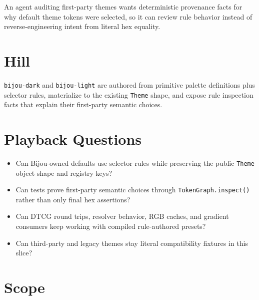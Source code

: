 An agent auditing first-party themes wants deterministic provenance facts for why default theme tokens were selected, so it can review rule behavior instead of reverse-engineering intent from literal hex equality.

\section{Hill}\label{record-185-hill}

\texttt{b\allowbreak{}i\allowbreak{}j\allowbreak{}o\allowbreak{}u\allowbreak{}-\allowbreak{}d\allowbreak{}a\allowbreak{}r\allowbreak{}k} and \texttt{b\allowbreak{}i\allowbreak{}j\allowbreak{}o\allowbreak{}u\allowbreak{}-\allowbreak{}l\allowbreak{}i\allowbreak{}g\allowbreak{}h\allowbreak{}t} are authored from primitive palette definitions plus selector rules, materialize to the existing \texttt{T\allowbreak{}h\allowbreak{}e\allowbreak{}m\allowbreak{}e} shape, and expose rule inspection facts that explain their first-party semantic choices.

\section{Playback Questions}\label{record-185-playback-questions}

\begin{itemize}
\tightlist
\item
  Can Bijou-owned defaults use selector rules while preserving the public \texttt{T\allowbreak{}h\allowbreak{}e\allowbreak{}m\allowbreak{}e} object shape and registry keys?
\item
  Can tests prove first-party semantic choices through \texttt{T\allowbreak{}o\allowbreak{}k\allowbreak{}e\allowbreak{}n\allowbreak{}G\allowbreak{}r\allowbreak{}a\allowbreak{}p\allowbreak{}h\allowbreak{}.\allowbreak{}i\allowbreak{}n\allowbreak{}s\allowbreak{}p\allowbreak{}e\allowbreak{}c\allowbreak{}t\allowbreak{}(\allowbreak{})} rather than only final hex assertions?
\item
  Can DTCG round trips, resolver behavior, RGB caches, and gradient consumers keep working with compiled rule-authored presets?
\item
  Can third-party and legacy themes stay literal compatibility fixtures in this slice?
\end{itemize}

\section{Scope}\label{record-185-scope}

